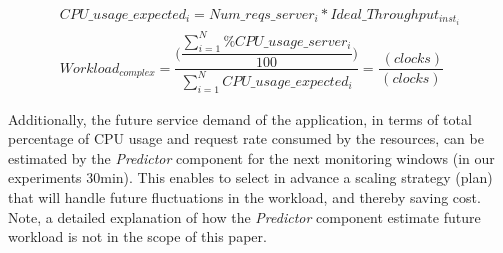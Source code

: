 \vspace{-5mm}
{\scriptsize
\begin{equation}\label{workload_complexity}
\begin{split}
CPU\_usage\_expected_{i} =  Num\_reqs\_server_{i}  * Ideal\_Throughput_{inst_{i}} \\
Workload_{complex}  = \dfrac{ \bigg(  \dfrac{ \sum_{i=1}^N \%CPU\_usage\_server_{i} } {100} \bigg) }  {  \sum_{i=1}^N  CPU\_usage\_expected_{i}     } = \dfrac{ \ (clocks) }  {  (clocks) }
\end{split}
\end{equation}
}

Additionally, the future service demand of the application, in terms of total percentage of CPU usage and request rate consumed by the resources, can be estimated by the \emph{Predictor} component for the next monitoring windows (in our experiments 30min). This enables to select in advance a scaling strategy (plan) that will handle future fluctuations in the workload, and thereby saving cost. Note, a detailed explanation of how the \emph{Predictor} component estimate future workload is not in the scope of this paper.




